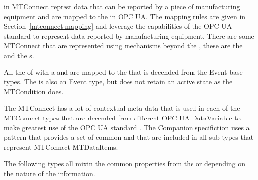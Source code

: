  in MTConnect represt data that can be reported by a piece of manufacturing equipment and are mapped to the  in OPC UA. The mapping rules are given in Section~\ref{mtconnect-mapping} and leverage the capabilities of the OPC UA standard to represent data reported by manufacturing equipment. There are some MTConnect  that are represented using mechanisms beyond the , these are the   and the  s.

All the  of with a   and are mapped to the  that is decended from the \gls{Event} base types. The  is also an \gls{Event} type, but does not retain an active state as the \gls{MTCondition} does.

The MTConnect  has a lot of contextual meta-data that is used in each of the MTConnect types that are decended from different OPC UA \gls{DataVariable} to make greatest use of the OPC UA standard \cite{UAPart8}. The Companion specifiction uses a  pattern that provides a set of common  and  that are included in all sub-types that represent MTConnect \glspl{MTDataItem}.

The following types all mixin the common properties from the  or  depending on the nature of the information. 

